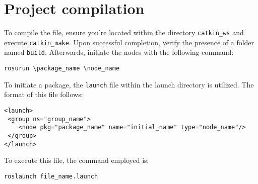 \section{Project compilation}

To compile the file, ensure you're located within the directory \texttt{catkin\_ws} and execute \texttt{catkin\_make}. 
Upon successful completion, verify the presence of a folder named \texttt{build}. 
Afterwards, initiate the nodes with the following command:
\begin{verbatim}
rosurun \package_name \node_name
\end{verbatim}

To initiate a package, the \texttt{launch} file within the launch directory is utilized. 
The format of this file follows:
\begin{verbatim}
<launch>
 <group ns="group_name">
    <node pkg="package_name" name="initial_name" type="node_name"/>
 </group>
</launch>
\end{verbatim}
To execute this file, the command employed is:
\begin{verbatim}
roslaunch file_name.launch
\end{verbatim}